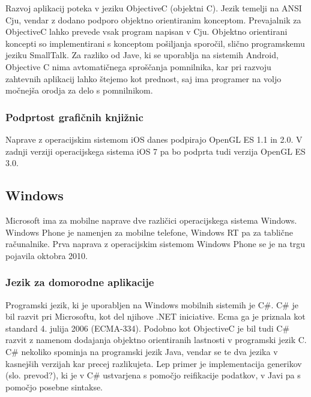 Razvoj aplikacij poteka v jeziku ObjectiveC (objektni C). Jezik temelji na ANSI Cju, vendar z dodano podporo objektno orientiranim konceptom. Prevajalnik za ObjectiveC lahko prevede vsak program napisan v Cju. Objektno orientirani koncepti so implementirani s konceptom pošiljanja sporočil, slično programskemu jeziku SmallTalk. Za razliko od Jave, ki se uporablja na sistemih Android, Objective C nima avtomatičnega sproščanja pomnilnika, kar pri razvoju zahtevnih aplikacij lahko štejemo kot prednost, saj ima programer na voljo močnejša orodja za delo s pomnilnikom. 

\subsubsection{Podprtost grafičnih knjižnic}

Naprave z operacijskim sistemom iOS danes podpirajo OpenGL ES 1.1 in 2.0. V zadnji verziji operacijskega sistema iOS 7 pa bo podprta tudi verzija OpenGL ES 3.0.

\subsection{Windows}

% 

Microsoft ima za mobilne naprave dve različici operacijskega sistema Windows. Windows Phone \cite{winphone} je namenjen za mobilne telefone, Windows RT pa za tablične računalnike. Prva naprava z operacijskim sistemom Windows Phone se je na trgu pojavila oktobra 2010.

\subsubsection{Jezik za domorodne aplikacije}

Programski jezik, ki je uporabljen na Windows mobilnih sistemih je C\#. C\# je bil razvit pri Microsoftu, kot del njihove .NET iniciative. Ecma ga je priznala kot standard 4. julija 2006 (ECMA-334). Podobno kot ObjectiveC je bil tudi C\# razvit z namenom dodajanja objektno orientiranih lastnosti v programski jezik C. C\# nekoliko spominja na programski jezik Java, vendar se te dva jezika v kasnejših verzijah kar precej razlikujeta. Lep primer je implementacija generikov (slo. prevod?), ki je v C\# ustvarjena s pomočjo reifikacije podatkov, v Javi pa s pomočjo posebne sintakse. 

